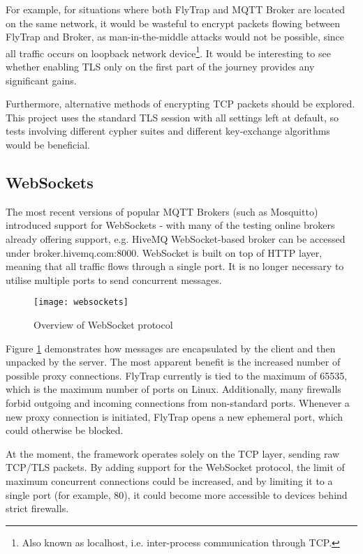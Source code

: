 For example, for situations where both FlyTrap and MQTT Broker are located on the same network, it would be wasteful to encrypt packets flowing between FlyTrap and Broker, as man-in-the-middle attacks would not be possible, since all traffic occurs on loopback network device\footnote{Also known as localhost, i.e. inter-process communication through TCP.}. It would be interesting to see whether enabling TLS only on the first part of the journey provides any significant gains.

Furthermore, alternative methods of encrypting TCP packets should be explored. This project uses the standard TLS session with all settings left at default, so tests involving different cypher suites and different key-exchange algorithms would be beneficial.
\subsection{WebSockets}
The most recent versions of popular MQTT Brokers (such as Mosquitto) introduced support for WebSockets - with many of the testing online brokers already offering support, e.g. HiveMQ WebSocket-based broker can be accessed under broker.hivemq.com:8000. WebSocket \cite{fette2011websocket} is built on top of HTTP layer, meaning that all traffic flows through a single port. It is no longer necessary to utilise multiple ports to send concurrent messages.

\begin{figure}[h]
    \centering
    \texttt{[image: websockets]}
    \caption{Overview of WebSocket protocol}
    \label{fig:websockets}
\end{figure}

Figure \ref{fig:websockets} demonstrates how messages are encapsulated by the client and then unpacked by the server. The most apparent benefit is the increased number of possible proxy connections. FlyTrap currently is tied to the maximum of 65535, which is the maximum number of ports on Linux. Additionally, many firewalls forbid outgoing and incoming connections from non-standard ports. Whenever a new proxy connection is initiated, FlyTrap opens a new ephemeral port, which could otherwise be blocked.

At the moment, the framework operates solely on the TCP layer, sending raw TCP/TLS packets. By adding support for the WebSocket protocol, the limit of maximum concurrent connections could be increased, and by limiting it to a single port (for example, 80), it could become more accessible to devices behind strict firewalls.
